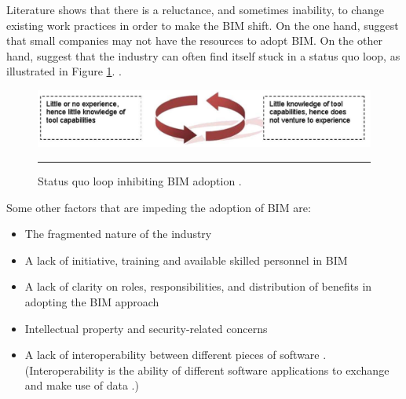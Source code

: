 Literature shows that there is a reluctance, and sometimes inability, to change existing work practices in order to make the BIM shift.
On the one hand, \cite{Laakso2012} suggest that small companies may not have the resources to adopt BIM.
On the other hand, \cite{Singh2011} suggest that the industry can often find itself stuck in a status quo loop, as illustrated in Figure \ref{loop}.
 \citep[p.~136]{Singh2011}.

\begin{figure}[htbp]
	\centering
	\includegraphics[width=\textwidth]{figures/Loop.png}
	\rule{\textwidth}{0.5pt} %
	\caption[Status quo loop inhibiting BIM adoption]{Status quo loop inhibiting BIM adoption \citep[p.~136]{Singh2011}.}
	\label{loop}
\end{figure}

\noindent
Some other factors that are impeding the adoption of BIM are:
\begin{itemize}
	\item The fragmented nature of the industry \citep{Singh2011,Neff2010} 
	\item A lack of initiative, training and available skilled personnel in BIM \citep{Singh2011,Ghaffarianhoseini2017}
	\item A lack of clarity on roles, responsibilities, and distribution of benefits in adopting the BIM approach \citep{Singh2011,Ghaffarianhoseini2017}
	\item Intellectual property and security-related concerns \citep{Ghaffarianhoseini2017,Laakso2012} 
	\item A lack of interoperability between different pieces of software \citep{GCS11-15,Laakso2012}. 
	(Interoperability is the ability of different software applications to exchange and make use of data \citep{Gallaher2004}.)
\end{itemize}



